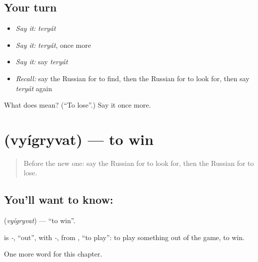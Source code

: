 \subsection*{Your turn}
\begin{itemize}
\raggedright
  \item \emph{Say it:} \emph{teryát}
  \item \emph{Say it:} \emph{teryát}, once more
  \item \emph{Say it:} say \emph{teryát}
  \item \emph{Recall:} say the Russian for to find, then the Russian for to look for, then say \emph{teryát} again
\end{itemize}

\begin{tcolorbox}[breakable,colback=teal!4,colframe=teal!35!black,title={Before you move on}]
What does  mean? (\textquotedblleft{}To lose\textquotedblright{}.) Say it once more.
\end{tcolorbox}
\section[\texorpdfstring{\ru{выигрывать} (vyígryvat)}{выигрывать (vyígryvat)}]{ (vyígryvat) — to win}

\label{lesson:RU-C135-to-win}



\begin{quote}
Before the new one: say the Russian for to look for, then the Russian for to lose.
\end{quote}

\subsection*{You'll want to know: }
\textbf{} (\emph{vyígryvat}) — \textquotedblleft{}to win\textquotedblright{}.

\begin{cousinweb}
\textbf{} is \emph{-}, \textquotedblleft{}out\textquotedblright{}, with \emph{-}, from \emph{}, \textquotedblleft{}to play\textquotedblright{}: to play something out of the game, to win.
\end{cousinweb}

\begin{grammarlens}[title={What you've built}]
One more word for this chapter.
\end{grammarlens}

